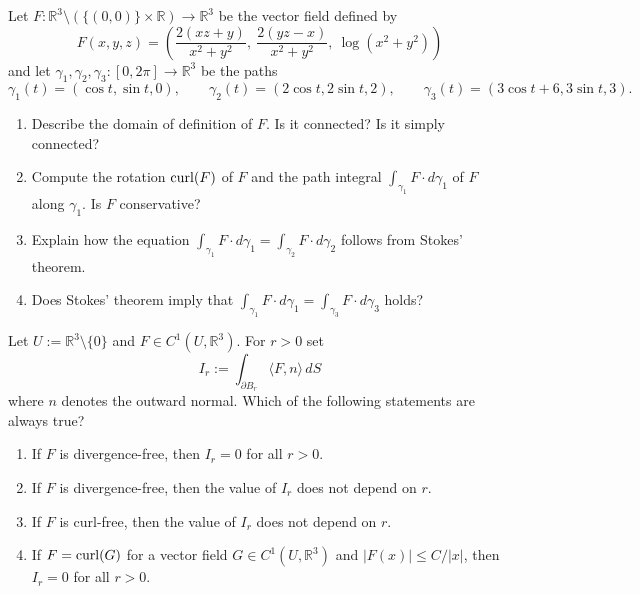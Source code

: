 \begin{exercise}
\label{ex:stokes_work_along_paths}
Let $F : \mathbb{R}^3 \setminus (\{(0,0)\}\times\mathbb{R}) \to \mathbb{R}^3$ be the vector
field defined by
\[F(x,y,z) = \left(\frac{2(xz+y)}{x^2+y^2},\ \frac{2(yz-x)}{x^2+y^2},\ \log(x^2+y^2)\right)\]
and let $\gamma_1,\gamma_2,\gamma_3 : [0,2\pi] \to \mathbb{R}^3$ be the paths
\[\gamma_1(t) = (\cos t,\sin t,0), \qquad \gamma_2(t) = (2\cos t,2\sin t,2), \qquad
  \gamma_3(t) = (3\cos t+6,3\sin t,3).\]
\begin{enumerate}[label=\textbf{(\alph*)}]
  \item Describe the domain of definition of $F$. Is it connected? Is it simply connected?
  \item Compute the rotation $\operatorname{curl}(F)$ of $F$ and the path integral $\int_{\gamma_1} F\cdot
  d\gamma_1$ of $F$ along $\gamma_1$. Is $F$ conservative?
  \item Explain how the equation $\int_{\gamma_1} F\cdot d\gamma_1 = \int_{\gamma_2} F\cdot
  d\gamma_2$ follows from Stokes' theorem.
  \item Does Stokes' theorem imply that $\int_{\gamma_1} F\cdot d\gamma_1 = \int_{\gamma_3}
  F\cdot d\gamma_3$ holds?
\end{enumerate}
\end{exercise}



\begin{exercise}
\label{ex:flux_on_punctured_domain}
Let $U := \mathbb{R}^3\setminus\{0\}$ and $F \in C^1(U,\mathbb{R}^3)$. For $r>0$ set
\[I_r := \int_{\partial B_r} \langle F,n\rangle\,dS\]
where $n$ denotes the outward normal. Which of the following statements are always true?
\begin{enumerate}[label=\textbf{(\alph*)}]
  \item If $F$ is divergence-free, then $I_r=0$ for all $r>0$.
  \item If $F$ is divergence-free, then the value of $I_r$ does not depend on $r$.
  \item If $F$ is curl-free, then the value of $I_r$ does not depend on $r$.
  \item If $F = \operatorname{curl}(G)$ for a vector field $G \in C^1(U,\mathbb{R}^3)$ and $\lvert F(x)
  \rvert \leq C/\lvert x\rvert$, then $I_r=0$ for all $r>0$.
\end{enumerate}
\end{exercise}

